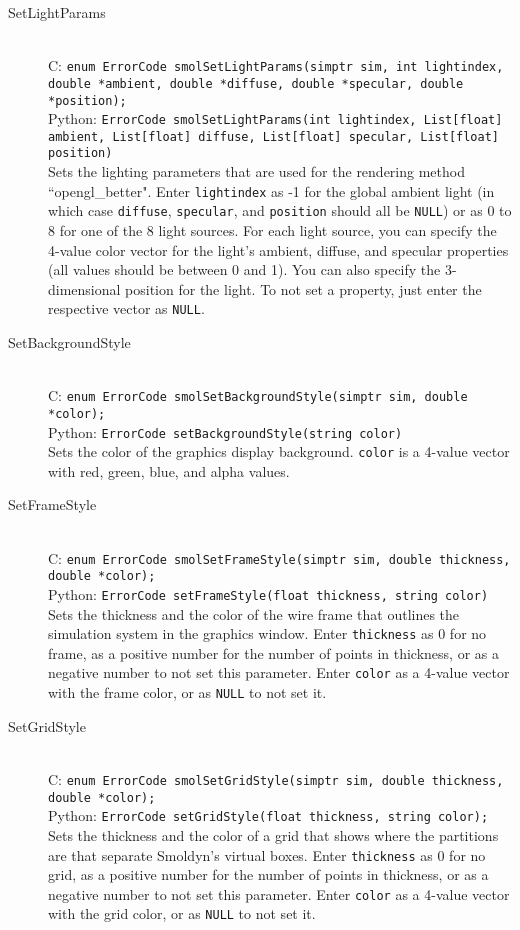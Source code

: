 \documentclass {book}
\begin{document}
\begin{description}
\item[SetLightParams]
\hfill \\
C: \texttt{enum ErrorCode smolSetLightParams(simptr sim, int lightindex, double *ambient, double *diffuse, double *specular, double *position);}\\
Python: \texttt{ErrorCode smolSetLightParams(int lightindex, List[float] ambient, List[float] diffuse, List[float] specular, List[float] position)}\\
Sets the lighting parameters that are used for the rendering method ``opengl\_better". Enter \texttt{lightindex} as -1 for the global ambient light (in which case \texttt{diffuse}, \texttt{specular}, and \texttt{position} should all be \texttt{NULL}) or as 0 to 8 for one of the 8 light sources. For each light source, you can specify the 4-value color vector for the light's ambient, diffuse, and specular properties (all values should be between 0 and 1). You can also specify the 3-dimensional position for the light. To not set a property, just enter the respective vector as \texttt{NULL}.

\item[SetBackgroundStyle]
\hfill \\
C: \texttt{enum ErrorCode smolSetBackgroundStyle(simptr sim, double *color);}\\
Python: \texttt{ErrorCode setBackgroundStyle(string color)}\\
Sets the color of the graphics display background. \texttt{color} is a 4-value vector with red, green, blue, and alpha values.

\item[SetFrameStyle]
\hfill \\
C: \texttt{enum ErrorCode smolSetFrameStyle(simptr sim, double thickness, double *color);}\\
Python: \texttt{ErrorCode setFrameStyle(float thickness, string color)}\\
Sets the thickness and the color of the wire frame that outlines the simulation system in the graphics window. Enter \texttt{thickness} as 0 for no frame, as a positive number for the number of points in thickness, or as a negative number to not set this parameter. Enter \texttt{color} as a 4-value vector with the frame color, or as \texttt{NULL} to not set it.

\item[SetGridStyle]
\hfill \\
C: \texttt{enum ErrorCode smolSetGridStyle(simptr sim, double thickness, double *color);}\\
Python: \texttt{ErrorCode setGridStyle(float thickness, string color);}\\
Sets the thickness and the color of a grid that shows where the partitions are that separate Smoldyn's virtual boxes. Enter \texttt{thickness} as 0 for no grid, as a positive number for the number of points in thickness, or as a negative number to not set this parameter. Enter \texttt{color} as a 4-value vector with the grid color, or as \texttt{NULL} to not set it.


\end{description}
\end{document}
